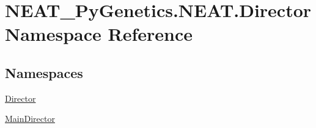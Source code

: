 \hypertarget{namespaceNEAT__PyGenetics_1_1NEAT_1_1Director}{}\section{N\+E\+A\+T\+\_\+\+Py\+Genetics.\+N\+E\+A\+T.\+Director Namespace Reference}
\label{namespaceNEAT__PyGenetics_1_1NEAT_1_1Director}
\subsection*{Namespaces}
\begin{DoxyCompactItemize}
\item 
 \hyperlink{namespaceNEAT__PyGenetics_1_1NEAT_1_1Director_1_1Director}{Director}
\item 
 \hyperlink{namespaceNEAT__PyGenetics_1_1NEAT_1_1Director_1_1MainDirector}{Main\+Director}
\end{DoxyCompactItemize}
